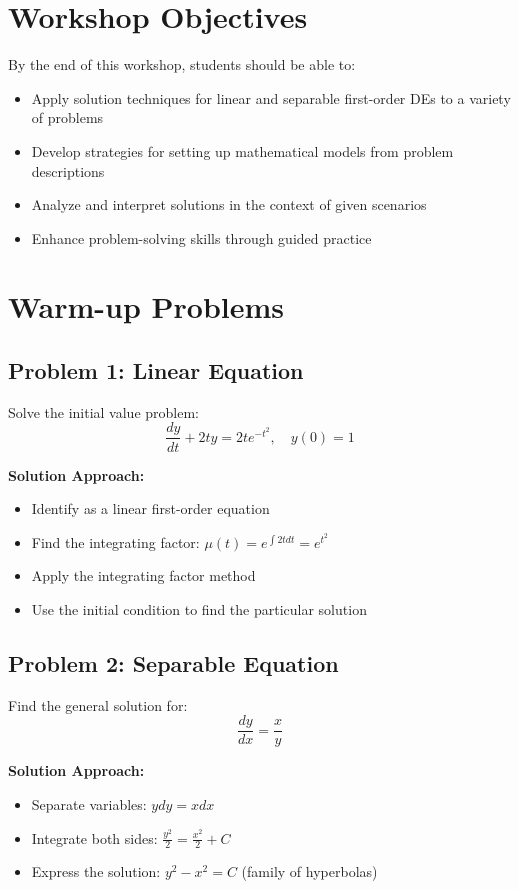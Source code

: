 \documentclass[12pt, letterpaper]{book}
\begin{document}
\section{Workshop Objectives}
By the end of this workshop, students should be able to:
\begin{itemize}
    \item Apply solution techniques for linear and separable first-order DEs to a variety of problems
    \item Develop strategies for setting up mathematical models from problem descriptions
    \item Analyze and interpret solutions in the context of given scenarios
    \item Enhance problem-solving skills through guided practice
\end{itemize}

\section{Warm-up Problems}

\subsection{Problem 1: Linear Equation}
Solve the initial value problem:
$$\frac{dy}{dt} + 2ty = 2te^{-t^2}, \quad y(0) = 1$$

\textbf{Solution Approach:}
\begin{itemize}
    \item Identify as a linear first-order equation
    \item Find the integrating factor: $\mu(t) = e^{\int 2t dt} = e^{t^2}$
    \item Apply the integrating factor method
    \item Use the initial condition to find the particular solution
\end{itemize}

\subsection{Problem 2: Separable Equation}
Find the general solution for:
$$\frac{dy}{dx} = \frac{x}{y}$$

\textbf{Solution Approach:}
\begin{itemize}
    \item Separate variables: $y dy = x dx$
    \item Integrate both sides: $\frac{y^2}{2} = \frac{x^2}{2} + C$
    \item Express the solution: $y^2 - x^2 = C$ (family of hyperbolas)
\end{itemize}
\end{document}
